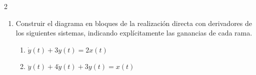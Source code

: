 \documentclass[10pt,a4paper]{article}
\begin{document}
\begin{multicols}{2}
\begin{enumerate}
			\item Construir el diagrama en bloques de la realización directa con derivadores de los siguientes sistemas, indicando explícitamente las ganancias de cada rama.
			\begin{enumerate}
				\item $\dot{y}(t)+3y(t)=2x(t)$
				\item $\ddot{y}(t)+4\dot{y}(t)+3y(t)=x(t)$
			\end{enumerate}

		\end{enumerate}
		
	\end{multicols}
\end{document}
